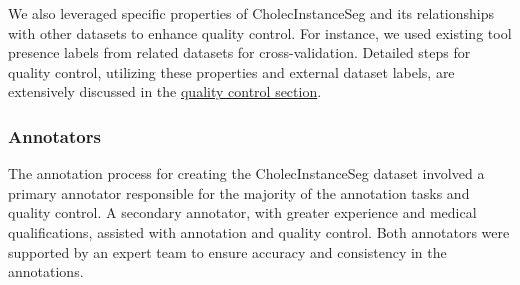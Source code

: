 \begin{enumerate}
    We also leveraged specific properties of CholecInstanceSeg and its relationships with other datasets to enhance quality control. For instance, we used existing tool presence labels from related datasets for cross-validation. Detailed steps for quality control, utilizing these properties and external dataset labels, are extensively discussed in the \hyperlink{sec:quality_control}{quality control section}.
\end{enumerate}

\subsubsection{Annotators}
The annotation process for creating the CholecInstanceSeg dataset involved a primary annotator responsible for the majority of the annotation tasks and quality control. A secondary annotator, with greater experience and medical qualifications, assisted with annotation and quality control. Both annotators were supported by an expert team to ensure accuracy and consistency in the annotations.








